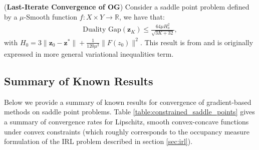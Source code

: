 \begin{proposition}
    (\textbf{Last-Iterate Convergence of OG}) Consider a saddle point problem defined by a $\mu$-Smooth function $f:X\times Y \rightarrow \mathbb{R}$, we have that:
    \begin{align*}
        \text{Duality Gap}({\bm{z}}_K) \leq \frac{64 \mu H_0^2}{\sqrt{3K+32}},
    \end{align*}
    with $H_0 = 3 \|\bm{z}_0-\bm{z}^*\| + \frac{1}{120\mu^2}\|F(z_0)\|^2$. This result is from \cite{gorbunov2022lastiterate} and is originally expressed in more general variational inequalities term.
\end{proposition}


\subsection{Summary of Known Results}

Below we provide a summary of known results for convergence of gradient-based methods on saddle point problems. Table \ref{table:constrained_saddle_points} gives a summary of convergence rates for Lipschitz, smooth convex-concave functions under convex constraints (which roughly corresponds to the occupancy measure formulation of the IRL problem described in section \ref{sec:irl}).


\begin{table}[h!]
    \centering
\caption{Convergence results for minimax optimization methods with convex constraints in the general (smooth) convex-concave setting.}
\label{table:constrained_saddle_points}
\end{table}
